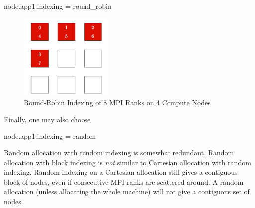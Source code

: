 \begin{ViFile}
node.app1.indexing = round_robin
\end{ViFile}
\begin{figure}[h]
\centering
\includegraphics[width=0.4\textwidth]{figures/tikz/indexing/roundrobin.png}
\caption{Round-Robin Indexing of 8 MPI Ranks on 4 Compute Nodes}
\label{fig:indexing:round_robin}
\end{figure}
Finally, one may also choose

\begin{ViFile}
node.app1.indexing = random
\end{ViFile}
Random allocation with random indexing is somewhat redundant.  
Random allocation with block indexing is \emph{not} similar to Cartesian allocation with random indexing.
Random indexing on a Cartesian allocation still gives a contiguous block of nodes,
even if consecutive MPI ranks are scattered around.
A random allocation (unless allocating the whole machine) will not give a contiguous set of nodes.
